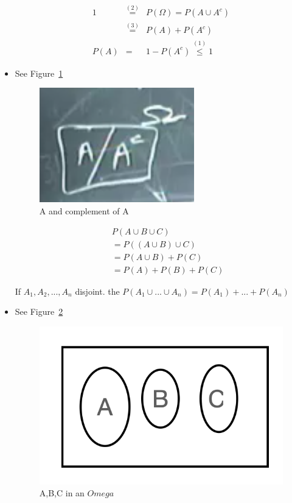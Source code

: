 \begin{itemize}
        \begin{eqnarray*}
            1 & \overset{(2)}{=} & P(\Omega) = P(A \cup A^c) \\
            & \overset{(3)}{=} & P(A) + P(A^c) \\
            P(A) & = & 1 - P(A^c) \overset{(1)}{\leq} 1
        \end{eqnarray*}

        \item See Figure~\ref{fig:1-5}
        \begin{figure}[h!]
            \centering
            \includegraphics[scale=0.7]{images/1-5}
            \caption{A and complement of A}
            \label{fig:1-5}
        \end{figure}

        \begin{eqnarray*}
            && P(A \cup B \cup C) \\
            && = P((A \cup B) \cup C) \\
            && = P(A \cup B) + P(C) \\
            && = P(A) + P(B) + P(C)
        \end{eqnarray*}

        If $A_1,A_2,...,A_n$ disjoint.
        the $P(A_1 \cup ... \cup A_n) = P(A_1)+...+P(A_n)$

        \item See Figure~\ref{fig:1-6}
        \begin{figure}[h!]
            \centering
            \includegraphics[scale=0.7]{images/1-6}
            \caption{A,B,C in an $Omega$}
            \label{fig:1-6}
        \end{figure}


\end{itemize}
